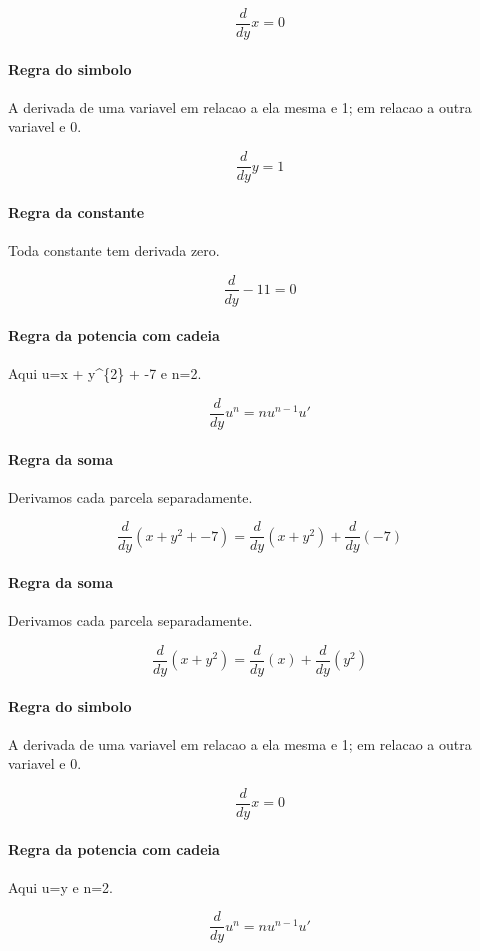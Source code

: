 \documentclass[11pt,a4paper]{article}
\begin{document}
\[
\frac{d}{dy}x=0
\]

\paragraph{Regra do simbolo} A derivada de uma variavel em relacao a ela mesma e 1; em relacao a outra variavel e 0.

\[
\frac{d}{dy}y=1
\]

\paragraph{Regra da constante} Toda constante tem derivada zero.

\[
\frac{d}{dy}-11=0
\]

\paragraph{Regra da potencia com cadeia} Aqui u=x + y\textasciicircum{}\{2\} + -7 e n=2.

\[
\frac{d}{dy}u^n=n u^{n-1}u'
\]

\paragraph{Regra da soma} Derivamos cada parcela separadamente.

\[
\frac{d}{dy}\left(x + y^{2} + -7\right)=\frac{d}{dy}\left(x + y^{2}\right)+\frac{d}{dy}\left(-7\right)
\]

\paragraph{Regra da soma} Derivamos cada parcela separadamente.

\[
\frac{d}{dy}\left(x + y^{2}\right)=\frac{d}{dy}\left(x\right)+\frac{d}{dy}\left(y^{2}\right)
\]

\paragraph{Regra do simbolo} A derivada de uma variavel em relacao a ela mesma e 1; em relacao a outra variavel e 0.

\[
\frac{d}{dy}x=0
\]

\paragraph{Regra da potencia com cadeia} Aqui u=y e n=2.

\[
\frac{d}{dy}u^n=n u^{n-1}u'
\]
\end{document}

